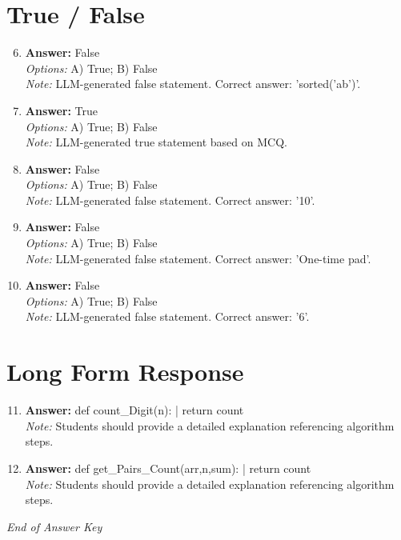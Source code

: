 \documentclass[12pt]{article}
\begin{document}
\section*{True / False}
\begin{enumerate}[label=\arabic*.]
\setcounter{enumi}{5}
\item \textbf{Answer:} False
\\ \textit{Options:} A) True; B) False
\\ \textit{Note:} LLM-generated false statement. Correct answer: 'sorted('ab')'.
\item \textbf{Answer:} True
\\ \textit{Options:} A) True; B) False
\\ \textit{Note:} LLM-generated true statement based on MCQ.
\item \textbf{Answer:} False
\\ \textit{Options:} A) True; B) False
\\ \textit{Note:} LLM-generated false statement. Correct answer: '10'.
\item \textbf{Answer:} False
\\ \textit{Options:} A) True; B) False
\\ \textit{Note:} LLM-generated false statement. Correct answer: 'One-time pad'.
\item \textbf{Answer:} False
\\ \textit{Options:} A) True; B) False
\\ \textit{Note:} LLM-generated false statement. Correct answer: '6'.
\end{enumerate}

\section*{Long Form Response}
\begin{enumerate}[label=\arabic*.]
\setcounter{enumi}{10}
\item \textbf{Answer:} def count\_Digit(n): | return count
\\ \textit{Note:} Students should provide a detailed explanation referencing algorithm steps.
\item \textbf{Answer:} def get\_Pairs\_Count(arr,n,sum): | return count
\\ \textit{Note:} Students should provide a detailed explanation referencing algorithm steps.
\end{enumerate}

\vfill
\noindent\textit{End of Answer Key}
\end{document}
